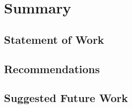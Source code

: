 \chapter{Summary}\label{ch:summary}

\section{Statement of Work}

\section{Recommendations}

\section{Suggested Future Work}
